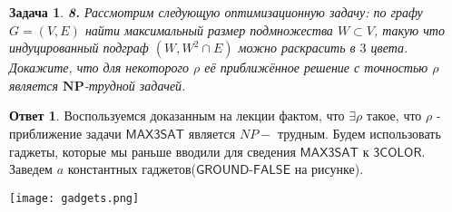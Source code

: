 \documentclass[a4paper]{article}
\theoremstyle{plain}
\newtheorem*{task}{Задача}
\theoremstyle{definition}
\newtheorem*{answer}{Ответ}
\begin{document}
\begin{task}\textbf{8.}
Рассмотрим следующую оптимизационную задачу: по графу $G=(V,E)$ найти максимальный размер подмножества $W \subset V$, такую что индуцированный подграф $(W,W^2\cap E)$ можно раскрасить в $3$ цвета. Докажите, что для некоторого $\rho$ её приближённое решение с точностью $\rho$ является $\mathbf{NP}$-трудной задачей.
\end{task}
\begin{answer}
Воспользуемся доказанным на лекции фактом, что $\exists \rho$ такое, что $\rho$ - приближение задачи $\textsf{MAX3SAT}$ является $NP-$ трудным. Будем использовать гаджеты, которые мы раньше вводили для сведения $\textsf{MAX3SAT}$ к  $\textsf{3COLOR}$. Заведем $a$ константных гаджетов($\textsf{GROUND-FALSE}$ на рисунке).
 
\begin{center}
\texttt{[image: gadgets.png]}
\end{center}
 

\end{answer}
\end{document}

